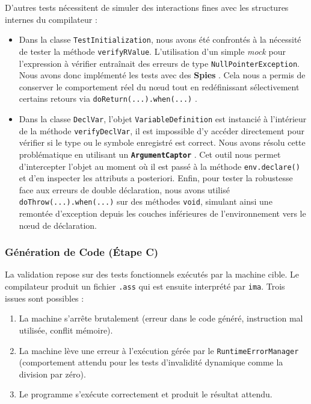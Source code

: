 \noindent
D'autres tests nécessitent de simuler des interactions fines avec les structures internes du compilateur :

\begin{itemize}[label=$\circ$]
    \item Dans la classe \texttt{TestInitialization}, nous avons été confrontés à la nécessité de tester la méthode \texttt{verifyRValue}. L'utilisation d'un simple \textit{mock} pour l'expression à vérifier entraînait des erreurs de type \texttt{NullPointerException}. Nous avons donc implémenté les tests avec des \textbf{Spies} \cite{browserstack-spy-vs-mock}. Cela nous a permis de conserver le comportement réel du nœud tout en redéfinissant sélectivement certains retours via \texttt{doReturn(...).when(...)} \cite{medium-mockito-stubbing}.
    \item Dans la classe \texttt{DeclVar}, l'objet \texttt{VariableDefinition} est instancié à l'intérieur de la méthode \texttt{verifyDeclVar}, il est impossible d'y accéder directement pour vérifier si le type ou le symbole enregistré est correct. Nous avons résolu cette problématique en utilisant un \textbf{\texttt{ArgumentCaptor}} \cite{browserstack-argumentcaptor}. Cet outil nous permet d'intercepter l'objet au moment où il est passé à la méthode \texttt{env.declare()} et d'en inspecter les attributs a posteriori. Enfin, pour tester la robustesse face aux erreurs de double déclaration, nous avons utilisé \texttt{doThrow(...).when(...)} \cite{javaguides-dothrow} sur des méthodes \texttt{void}, simulant ainsi une remontée d'exception depuis les couches inférieures de l'environnement vers le nœud de déclaration.
\end{itemize}

\subsubsection{Génération de Code (Étape C)} 
\noindent
La validation repose sur des tests fonctionnels exécutés par la machine cible. Le compilateur produit un fichier \texttt{.ass} qui est ensuite interprété par \texttt{ima}. Trois issues sont possibles : 
\begin{enumerate}
    \item La machine s'arrête brutalement (erreur dans le code généré, instruction mal utilisée, conflit mémoire).
    \item La machine lève une erreur à l'exécution gérée par le \texttt{RuntimeErrorManager} (comportement attendu pour les tests d'invalidité dynamique comme la division par zéro).
    \item Le programme s'exécute correctement et produit le résultat attendu.
\end{enumerate}

